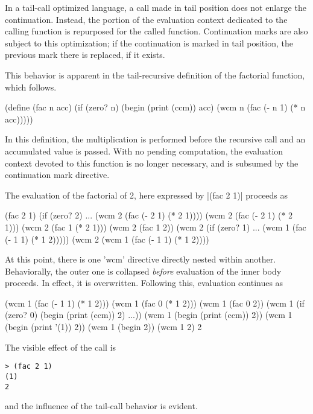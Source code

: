 \documentclass{llncs}
\begin{document}
In a tail-call optimized language, a call made in tail position does not enlarge the continuation. Instead, the portion of the evaluation context dedicated to the calling function is repurposed for the called function. Continuation marks are also subject to this optimization; if the continuation is marked in tail position, the previous mark there is replaced, if it exists.

This behavior is apparent in the tail-recursive definition of the factorial function, which follows.
\begin{schemedisplay}
(define (fac n acc)
  (if (zero? n)
      (begin
        (print (ccm))
        acc)
      (wcm n (fac (- n 1) (* n acc)))))
\end{schemedisplay}
In this definition, the multiplication is performed before the recursive call and an accumulated value is passed. With no pending computation, the evaluation context devoted to this function is no longer necessary, and is subsumed by the continuation mark directive.

The evaluation of the factorial of 2, here expressed by \scheme|(fac 2 1)| proceeds as
\begin{schemedisplay}
(fac 2 1)
(if (zero? 2) ... (wcm 2 (fac (- 2 1) (* 2 1))))
(wcm 2 (fac (- 2 1) (* 2 1)))
(wcm 2 (fac 1 (* 2 1)))
(wcm 2 (fac 1 2))
(wcm 2 (if (zero? 1) ... (wcm 1 (fac (- 1 1) (* 1 2)))))
(wcm 2 (wcm 1 (fac (- 1 1) (* 1 2))))
\end{schemedisplay}
At this point, there is one \scheme'wcm' directive directly nested within another. Behaviorally, the outer one is collapsed \emph{before} evaluation of the inner body proceeds. In effect, it is overwritten. Following this, evaluation continues as
\begin{schemedisplay}
(wcm 1 (fac (- 1 1) (* 1 2)))
(wcm 1 (fac 0 (* 1 2)))
(wcm 1 (fac 0 2))
(wcm 1 (if (zero? 0) (begin (print (ccm)) 2) ...))
(wcm 1 (begin (print (ccm)) 2))
(wcm 1 (begin (print '(1)) 2))
(wcm 1 (begin 2))
(wcm 1 2)
2
\end{schemedisplay}
The visible effect of the call is
\begin{verbatim}
> (fac 2 1)
(1)
2
\end{verbatim}
and the influence of the tail-call behavior is evident.

\end{document}
